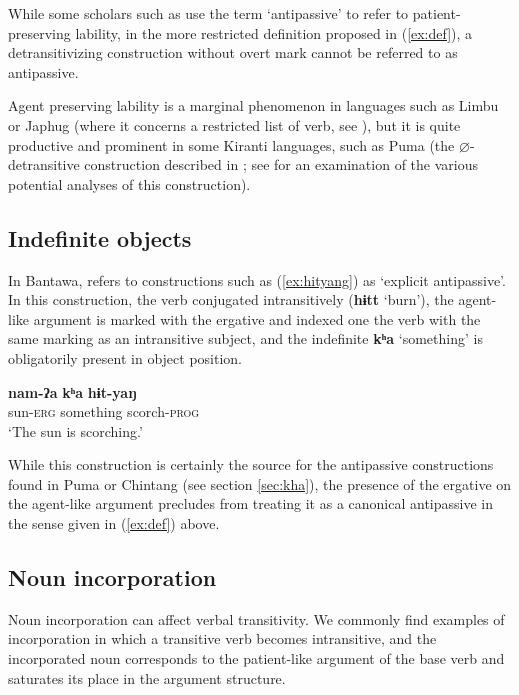 \documentclass[oneside,a4paper,11pt]{article}
\newcommand{\ipa}[1]{{\phon\textbf{#1}}}
\begin{document}
 While some scholars such as \citet[359]{schackow15yakkha} use the term `antipassive' to refer to patient-preserving lability, in the more restricted definition proposed in (\ref{ex:def}), a detransitivizing construction without overt mark cannot be referred to as antipassive.

Agent preserving lability is a marginal phenomenon in languages such as Limbu or Japhug (where it concerns a restricted list of verb, see \citealt[218]{jacques12demotion}), but it is quite productive and prominent in some Kiranti languages, such as Puma (the $\varnothing$-detransitive construction described in \citealt[9]{bickel07puma}; see \citealt{bickel11multivariate} for an examination of the various potential analyses of this construction).
 
\subsection{Indefinite objects} \label{sec:indef}
In Bantawa, \citet[226;335]{doornenbal09} refers to constructions such as (\ref{ex:hityang}) as `explicit antipassive'. In this construction, the verb conjugated intransitively (\ipa{hɨtt} `burn'), the agent-like argument is marked with the ergative and indexed one the verb with the same marking as an intransitive subject, and the indefinite \ipa{kʰa} `something' is obligatorily present in object position.

\begin{exe}
\ex \label{ex:hityang}
\gll 
\ipa{nam-ʔa} \ipa{kʰa} \ipa{hɨt-yaŋ} \\
sun-\textsc{erg} something scorch-\textsc{prog} \\
\glt ‘The sun is scorching.’
\end{exe}

While this construction is certainly the source for the antipassive constructions found in Puma or Chintang (see section \ref{sec:kha}), the presence of the ergative on the agent-like argument precludes from treating it as a canonical antipassive in the sense given in (\ref{ex:def}) above.

\subsection{Noun incorporation} \label{sec:incorp}
Noun incorporation can affect verbal transitivity. We commonly find examples of incorporation in which a transitive verb becomes intransitive, and the incorporated noun corresponds to the patient-like argument of the base verb and saturates its place in the argument structure.
\end{document}
